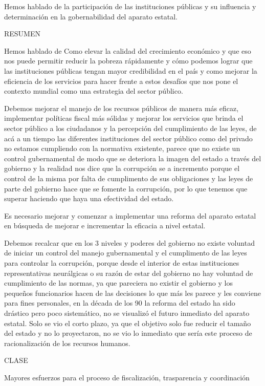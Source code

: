 \documentclass[
  jou,
  floatsintext,
  longtable,
  a4paper,
  nolmodern,
  notxfonts,
  notimes,
  12pt,
  colorlinks=true,linkcolor=blue,citecolor=blue,urlcolor=blue]{apa7}
\begin{document}
Hemos hablado de la participación de las instituciones públicas y su
influencia y determinación en la gobernabilidad del aparato estatal.

RESUMEN

Hemos hablado de Como elevar la calidad del crecimiento económico y que
eso nos puede permitir reducir la pobreza rápidamente y cómo podemos
lograr que las instituciones públicas tengan mayor credibilidad en el
país y como mejorar la eficiencia de los servicios para hacer frente a
estos desafíos que nos pone el contexto mundial como una estrategia del
sector público.

Debemos mejorar el manejo de los recursos públicos de manera más eficaz,
implementar políticas fiscal más sólidas y mejorar los servicios que
brinda el sector público a los ciudadanos y la percepción del
cumplimiento de las leyes, de acá a un tiempo las diferentes
instituciones del sector público como del privado no estamos cumpliendo
con la normativa existente, parece que no existe un control
gubernamental de modo que se deteriora la imagen del estado a través del
gobierno y la realidad nos dice que la corrupción se a incremento porque
el control de la misma por falta de cumplimento de sus obligaciones y
las leyes de parte del gobierno hace que se fomente la corrupción, por
lo que tenemos que superar haciendo que haya una efectividad del estado.

Es necesario mejorar y comenzar a implementar una reforma del aparato
estatal en búsqueda de mejorar e incrementar la eficacia a nivel
estatal.

Debemos recalcar que en los 3 niveles y poderes del gobierno no existe
voluntad de iniciar un control del manejo gubernamental y el cumplimento
de las leyes para controlar la corrupción, porque desde el interior de
estas instituciones representativas neurálgicas o su razón de estar del
gobierno no hay voluntad de cumplimiento de las normas, ya que pareciera
no existir el gobierno y los pequeños funcionarios hacen de las
decisiones lo que más les parece y les conviene para fines personales,
en la década de los 90 la reforma del estado ha sido drástico pero poco
sistemático, no se visualizó el futuro inmediato del aparato estatal.
Solo se vio el corto plazo, ya que el objetivo solo fue reducir el
tamaño del estado y no lo proyectaron, no se vio lo inmediato que sería
este proceso de racionalización de los recursos humanos.

CLASE

Mayores esfuerzos para el proceso de fiscalización, trasparencia y
coordinación
\end{document}
